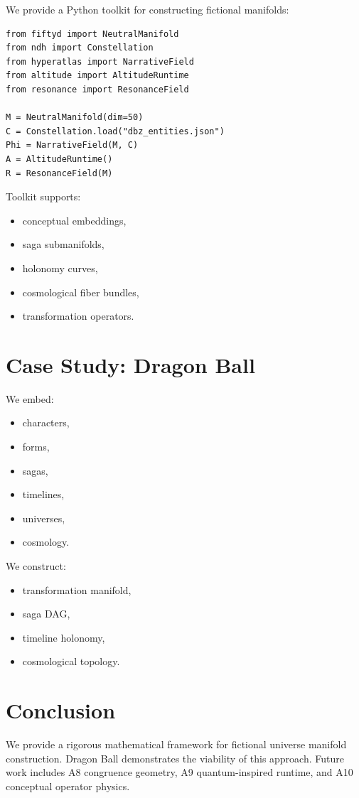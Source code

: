 \documentclass[11pt]{article}
\begin{document}
We provide a Python toolkit for constructing fictional manifolds:

\begin{verbatim}
from fiftyd import NeutralManifold
from ndh import Constellation
from hyperatlas import NarrativeField
from altitude import AltitudeRuntime
from resonance import ResonanceField

M = NeutralManifold(dim=50)
C = Constellation.load("dbz_entities.json")
Phi = NarrativeField(M, C)
A = AltitudeRuntime()
R = ResonanceField(M)
\end{verbatim}

Toolkit supports:
\begin{itemize}
  \item conceptual embeddings,
  \item saga submanifolds,
  \item holonomy curves,
  \item cosmological fiber bundles,
  \item transformation operators.
\end{itemize}

\section{Case Study: Dragon Ball}

We embed:
\begin{itemize}
  \item characters,
  \item forms,
  \item sagas,
  \item timelines,
  \item universes,
  \item cosmology.
\end{itemize}

We construct:
\begin{itemize}
  \item transformation manifold,
  \item saga DAG,
  \item timeline holonomy,
  \item cosmological topology.
\end{itemize}

\section{Conclusion}

We provide a rigorous mathematical framework for fictional universe 
manifold construction. Dragon Ball demonstrates the viability of this 
approach. Future work includes A8 congruence geometry, A9 quantum-inspired 
runtime, and A10 conceptual operator physics.
\end{document}

